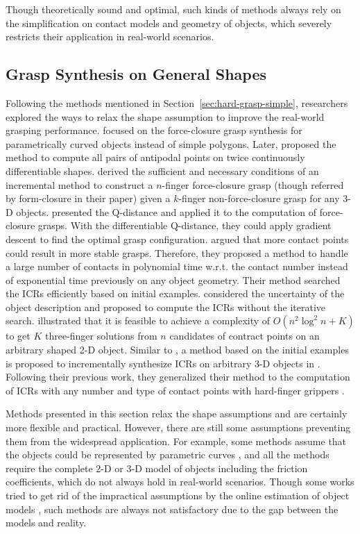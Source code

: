 \documentclass[letterpaper,10pt]{article}
\newcommand{\secref}[1]{Section~\ref{#1}}
\begin{document}
Though theoretically sound and optimal, such kinds of methods always rely on the simplification on contact models and geometry of objects, which severely restricts their application in real-world scenarios.

\subsection{Grasp Synthesis on General Shapes}

Following the methods mentioned in \secref{sec:hard-grasp-simple}, researchers explored the ways to relax the shape assumption to improve the real-world grasping performance. 
\cite{faverjon1991computing} focused on the force-closure grasp synthesis for parametrically curved objects instead of simple polygons.
Later, \cite{jia2004computation} proposed the method to compute all pairs of antipodal points \cite{chen1993finding} on twice continuously differentiable shapes.
\cite{ding2001computation} derived the sufficient and necessary conditions of an incremental method to construct a $n$-finger force-closure grasp (though referred by form-closure in their paper) given a $k$-finger non-force-closure grasp for any 3-D objects.
\cite{zhu2003synthesis} presented the Q-distance and applied it to the computation of force-closure grasps. With the differentiable Q-distance, they could apply gradient descent to find the optimal grasp configuration.
\cite{pollard2004closure} argued that more contact points could result in more stable grasps.
Therefore, they proposed a method to handle a large number of contacts in polynomial time w.r.t. the contact number instead of exponential time previously on any object geometry.
Their method searched the ICRs efficiently based on initial examples.
\cite{cornelia2005determining} considered the uncertainty of the object description and proposed to compute the ICRs without the iterative search.
\cite{niparnan2006computing} illustrated that it is feasible to achieve a complexity of $O(n^2\log^2 n+K)$ to get $K$ three-finger solutions from $n$ candidates of contract points on an arbitrary shaped 2-D object.
Similar to \cite{pollard2004closure}, a method based on the initial examples is proposed to incrementally synthesize ICRs on arbitrary 3-D objects in \cite{roa2008independent}.
Following their previous work, they generalized their method to the computation of ICRs with any number and type of contact points with hard-finger grippers \cite{roa2009computation}.

Methods presented in this section relax the shape assumptions and are certainly more flexible and practical. However, there are still some assumptions preventing them from the widespread application. For example, some methods assume that the objects could be represented by parametric curves \cite{faverjon1991computing, zhu2003synthesis, jia2004computation}, and all the methods require the complete 2-D or 3-D model of objects including the friction coefficients, which do not always hold in real-world scenarios. Though some works tried to get rid of the impractical assumptions by the online estimation of object models \cite{kragic2001real, rosales2012synthesis, rodriguez2012caging, zhang2012application}, such methods are always not satisfactory due to the gap between the models and reality.
\end{document}
